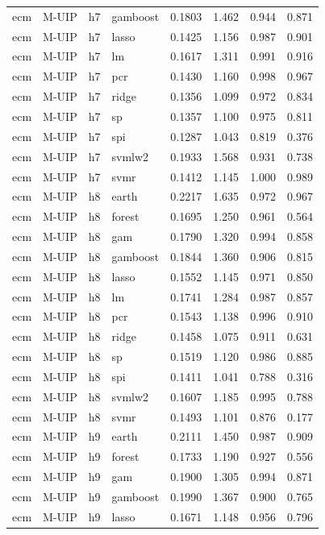 \begin{ThreePartTable}
\begin{longtable}[t]{llclcccc}
ecm & M-UIP & h7 & gamboost & 0.1803 & 1.462 & 0.944 & 0.871\\
ecm & M-UIP & h7 & lasso & 0.1425 & 1.156 & 0.987 & 0.901\\
ecm & M-UIP & h7 & lm & 0.1617 & 1.311 & 0.991 & 0.916\\
ecm & M-UIP & h7 & pcr & 0.1430 & 1.160 & 0.998 & 0.967\\
ecm & M-UIP & h7 & ridge & 0.1356 & 1.099 & 0.972 & 0.834\\
ecm & M-UIP & h7 & sp & 0.1357 & 1.100 & 0.975 & 0.811\\
ecm & M-UIP & h7 & spi & 0.1287 & 1.043 & 0.819 & 0.376\\
ecm & M-UIP & h7 & svmlw2 & 0.1933 & 1.568 & 0.931 & 0.738\\
ecm & M-UIP & h7 & svmr & 0.1412 & 1.145 & 1.000 & 0.989\\
\addlinespace
ecm & M-UIP & h8 & earth & 0.2217 & 1.635 & 0.972 & 0.967\\
ecm & M-UIP & h8 & forest & 0.1695 & 1.250 & 0.961 & 0.564\\
ecm & M-UIP & h8 & gam & 0.1790 & 1.320 & 0.994 & 0.858\\
ecm & M-UIP & h8 & gamboost & 0.1844 & 1.360 & 0.906 & 0.815\\
ecm & M-UIP & h8 & lasso & 0.1552 & 1.145 & 0.971 & 0.850\\
ecm & M-UIP & h8 & lm & 0.1741 & 1.284 & 0.987 & 0.857\\
ecm & M-UIP & h8 & pcr & 0.1543 & 1.138 & 0.996 & 0.910\\
ecm & M-UIP & h8 & ridge & 0.1458 & 1.075 & 0.911 & 0.631\\
ecm & M-UIP & h8 & sp & 0.1519 & 1.120 & 0.986 & 0.885\\
ecm & M-UIP & h8 & spi & 0.1411 & 1.041 & 0.788 & 0.316\\
ecm & M-UIP & h8 & svmlw2 & 0.1607 & 1.185 & 0.995 & 0.788\\
ecm & M-UIP & h8 & svmr & 0.1493 & 1.101 & 0.876 & 0.177\\
\addlinespace
ecm & M-UIP & h9 & earth & 0.2111 & 1.450 & 0.987 & 0.909\\
ecm & M-UIP & h9 & forest & 0.1733 & 1.190 & 0.927 & 0.556\\
ecm & M-UIP & h9 & gam & 0.1900 & 1.305 & 0.994 & 0.871\\
ecm & M-UIP & h9 & gamboost & 0.1990 & 1.367 & 0.900 & 0.765\\
ecm & M-UIP & h9 & lasso & 0.1671 & 1.148 & 0.956 & 0.796\\

\end{longtable}
\end{ThreePartTable}
